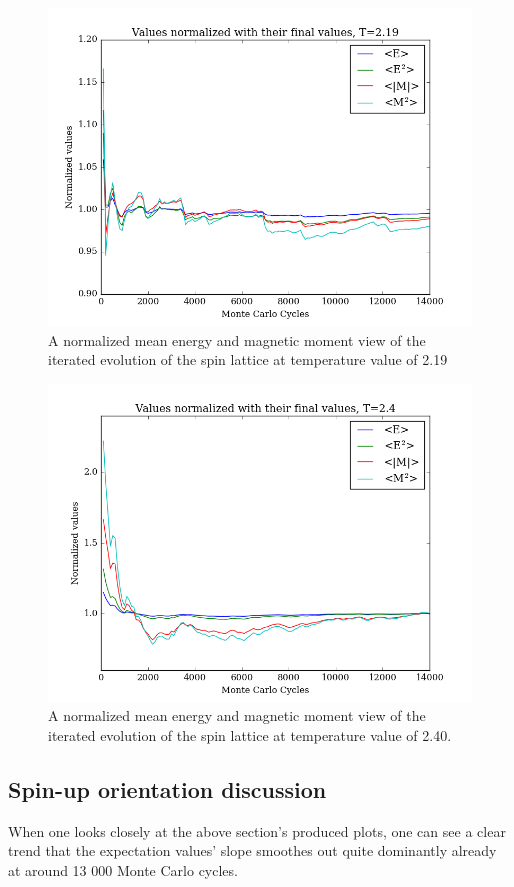 \documentclass[11pt,a4paper,notitlepage,twocolumn]{article}
\begin{document}
\begin{figure}
[H]\center
\includegraphics[scale=0.35]{../figs/4c/Prob_L20_mc100000_T219_spinup.png}
\caption{A normalized mean energy and magnetic moment view of the iterated evolution of the spin lattice at temperature value of 2.19}
\end{figure}
\begin{figure}
[H]\center
\includegraphics[scale=0.35]{../figs/4c/Prob_L20_mc100000_T240_spinup.png}
\caption{A normalized mean energy and magnetic moment view of the iterated evolution of the spin lattice at temperature value of 2.40.}
\end{figure}
\subsection{Spin-up orientation discussion}
When one looks closely at the above section's produced plots, one can see a clear trend that the expectation values' slope smoothes out quite dominantly already at around 13 000 Monte Carlo cycles.
\end{document}
